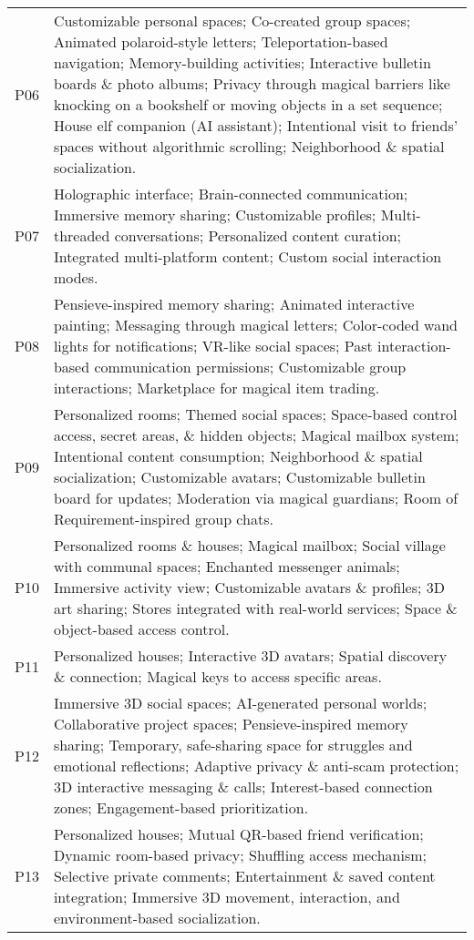 \begin{spacing}{1.0}
\begin{longtable}{lp{13cm}}
    P06 & Customizable personal spaces; Co-created group spaces; Animated polaroid-style letters; Teleportation-based navigation; Memory-building activities; Interactive bulletin boards \& photo albums; Privacy through magical barriers like knocking on a bookshelf or moving objects in a set sequence; House elf companion (AI assistant); Intentional visit to friends' spaces without algorithmic scrolling; Neighborhood \& spatial socialization. \\
    P07 & Holographic interface; Brain-connected communication; Immersive memory sharing; Customizable profiles; Multi-threaded conversations; Personalized content curation; Integrated multi-platform content; Custom social interaction modes. \\
    P08 & Pensieve-inspired memory sharing; Animated interactive painting; Messaging through magical letters; Color-coded wand lights for notifications; VR-like social spaces; Past interaction-based communication permissions; Customizable group interactions; Marketplace for magical item trading. \\
    P09 & Personalized rooms; Themed social spaces; Space-based control access, secret areas, \& hidden objects; Magical mailbox system; Intentional content consumption; Neighborhood \& spatial socialization; Customizable avatars; Customizable bulletin board for updates; Moderation via magical guardians; Room of Requirement-inspired group chats. \\
    P10 & Personalized rooms \& houses; Magical mailbox; Social village with communal spaces; Enchanted messenger animals; Immersive activity view; Customizable avatars \& profiles; 3D art sharing; Stores integrated with real-world services; Space \& object-based access control. \\
    P11 & Personalized houses; Interactive 3D avatars; Spatial discovery \& connection; Magical keys to access specific areas. \\
    P12 & Immersive 3D social spaces; AI-generated personal worlds; Collaborative project spaces; Pensieve-inspired memory sharing; Temporary, safe-sharing space for struggles and emotional reflections; Adaptive privacy \& anti-scam protection; 3D interactive messaging \& calls; Interest-based connection zones; Engagement-based prioritization. \\
    P13 & Personalized houses; Mutual QR-based friend verification; Dynamic room-based privacy; Shuffling access mechanism; Selective private comments; Entertainment \& saved content integration; Immersive 3D movement, interaction, and environment-based socialization. \\

\end{longtable}
\end{spacing}
